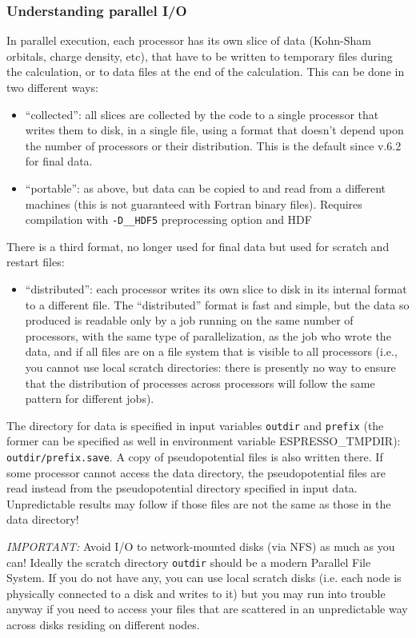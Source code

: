 \documentclass[12pt,a4paper]{article}
\begin{document}
\subsubsection{Understanding parallel I/O}
In parallel execution, each processor has its own slice of data
(Kohn-Sham orbitals, charge density, etc), that have to be written
to temporary files during the calculation,
or to data files at the end of the calculation.
This can be done in two different ways:
\begin{itemize}
\item ``collected'': all slices are
collected by the code to a single processor
that writes them to disk, in a single file,
using a format that doesn't depend upon
the number of processors or their distribution.
This is the default since v.6.2 for final data.
\item ``portable'': as above, but data can be 
copied to and read from a different machines
(this is not guaranteed with Fortran binary files).
Requires compilation with \verb|-D__HDF5|
preprocessing option and HDF%
\end{itemize}
There is a third format, no longer used for final
data but used for scratch and restart files:
\begin{itemize}
\item ``distributed'': each processor
writes its own slice to disk in its internal
format to a different file.
The ``distributed'' format is fast and simple,
but the data so produced is readable only by
a job running on the same number of processors,
with the same type of parallelization, as the
job who wrote the data, and if all
files are on a file system that is visible to all
processors (i.e., you cannot use local scratch
directories: there is presently no way to ensure
that the distribution of processes across
processors will follow the same pattern
for different jobs).
\end{itemize}

The directory for data is specified in input variables
\texttt{outdir} and \texttt{prefix} (the former can be specified
as well in environment variable ESPRESSO\_TMPDIR):
\texttt{outdir/prefix.save}. A copy of pseudopotential files
is also written there. If some processor cannot access the
data directory, the pseudopotential files are read instead
from the pseudopotential directory specified in input data.
Unpredictable results may follow if those files
are not the same as those in the data directory!

{\em IMPORTANT:}
Avoid I/O to network-mounted disks (via NFS) as much as you can!
Ideally the scratch directory \texttt{outdir} should be a modern
Parallel File System. If you do not have any, you can use local
scratch disks (i.e. each node is physically connected to a disk
and writes to it) but you may run into trouble anyway if you
need to access your files that are scattered in an unpredictable
way across disks residing on different nodes.
\end{document}
